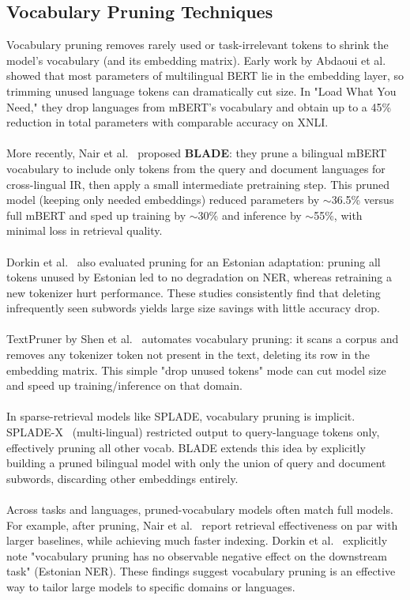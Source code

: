 \documentclass[twocolumn]{article}
\begin{document}
\subsection{Vocabulary Pruning Techniques}
Vocabulary pruning removes rarely used or task-irrelevant tokens to shrink the model's vocabulary (and its embedding matrix). Early work by Abdaoui et al.~\cite{abdaoui2020load} showed that most parameters of multilingual BERT lie in the embedding layer, so trimming unused language tokens can dramatically cut size. In "Load What You Need," they drop languages from mBERT's vocabulary and obtain up to a 45\% reduction in total parameters with comparable accuracy on XNLI.
\\ \\
More recently, Nair et al.~\cite{nair2023blade} proposed \textbf{BLADE}: they prune a bilingual mBERT vocabulary to include only tokens from the query and document languages for cross-lingual IR, then apply a small intermediate pretraining step. This pruned model (keeping only needed embeddings) reduced parameters by $\sim$36.5\% versus full mBERT and sped up training by $\sim$30\% and inference by $\sim$55\%, with minimal loss in retrieval quality.
\\ \\
Dorkin et al.~\cite{dorkin2025estonian} also evaluated pruning for an Estonian adaptation: pruning all tokens unused by Estonian led to no degradation on NER, whereas retraining a new tokenizer hurt performance. These studies consistently find that deleting infrequently seen subwords yields large size savings with little accuracy drop.
\\ \\
TextPruner by Shen et al.~\cite{shen2022textpruner} automates vocabulary pruning: it scans a corpus and removes any tokenizer token not present in the text, deleting its row in the embedding matrix. This simple "drop unused tokens" mode can cut model size and speed up training/inference on that domain.
\\ \\
In sparse-retrieval models like SPLADE, vocabulary pruning is implicit. SPLADE-X~\cite{formal2023spladex} (multi-lingual) restricted output to query-language tokens only, effectively pruning all other vocab. BLADE extends this idea by explicitly building a pruned bilingual model with only the union of query and document subwords, discarding other embeddings entirely.
\\ \\
Across tasks and languages, pruned-vocabulary models often match full models. For example, after pruning, Nair et al.~\cite{nair2023blade} report retrieval effectiveness on par with larger baselines, while achieving much faster indexing. Dorkin et al.~\cite{dorkin2025estonian} explicitly note "vocabulary pruning has no observable negative effect on the downstream task" (Estonian NER). These findings suggest vocabulary pruning is an effective way to tailor large models to specific domains or languages.
\end{document}
